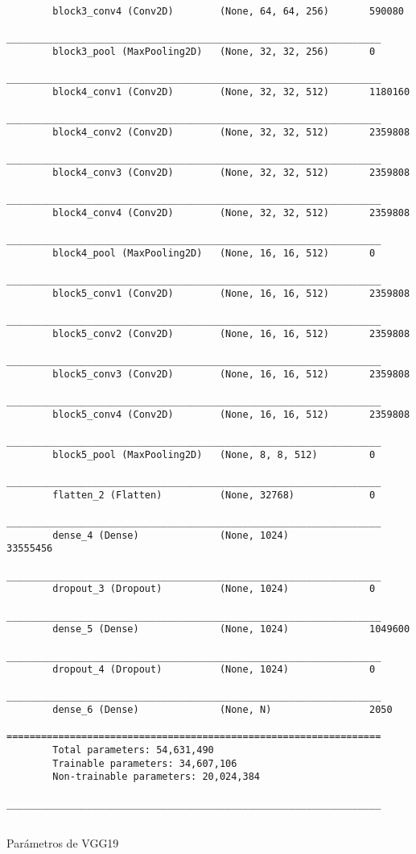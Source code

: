\begin{table}[H]
\begin{lstlisting}
        block3_conv4 (Conv2D)        (None, 64, 64, 256)       590080    
        _________________________________________________________________
        block3_pool (MaxPooling2D)   (None, 32, 32, 256)       0         
        _________________________________________________________________
        block4_conv1 (Conv2D)        (None, 32, 32, 512)       1180160   
        _________________________________________________________________
        block4_conv2 (Conv2D)        (None, 32, 32, 512)       2359808   
        _________________________________________________________________
        block4_conv3 (Conv2D)        (None, 32, 32, 512)       2359808   
        _________________________________________________________________
        block4_conv4 (Conv2D)        (None, 32, 32, 512)       2359808   
        _________________________________________________________________
        block4_pool (MaxPooling2D)   (None, 16, 16, 512)       0         
        _________________________________________________________________
        block5_conv1 (Conv2D)        (None, 16, 16, 512)       2359808   
        _________________________________________________________________
        block5_conv2 (Conv2D)        (None, 16, 16, 512)       2359808   
        _________________________________________________________________
        block5_conv3 (Conv2D)        (None, 16, 16, 512)       2359808   
        _________________________________________________________________
        block5_conv4 (Conv2D)        (None, 16, 16, 512)       2359808   
        _________________________________________________________________
        block5_pool (MaxPooling2D)   (None, 8, 8, 512)         0         
        _________________________________________________________________
        flatten_2 (Flatten)          (None, 32768)             0         
        _________________________________________________________________
        dense_4 (Dense)              (None, 1024)              33555456  
        _________________________________________________________________
        dropout_3 (Dropout)          (None, 1024)              0         
        _________________________________________________________________
        dense_5 (Dense)              (None, 1024)              1049600   
        _________________________________________________________________
        dropout_4 (Dropout)          (None, 1024)              0         
        _________________________________________________________________
        dense_6 (Dense)              (None, N)                 2050      
        =================================================================
        Total parameters: 54,631,490
        Trainable parameters: 34,607,106
        Non-trainable parameters: 20,024,384
        _________________________________________________________________
        
    \end{lstlisting}
    \caption{Parámetros de VGG19}\label{tabla:modelo}
\end{table}

